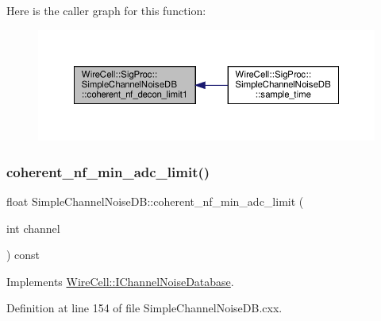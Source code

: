 Here is the caller graph for this function\+:
\nopagebreak
\begin{figure}[H]
\begin{center}
\leavevmode
\includegraphics[width=350pt]{class_wire_cell_1_1_sig_proc_1_1_simple_channel_noise_d_b_a570a71f729172f7b19659f21d44b2e81_icgraph}
\end{center}
\end{figure}
\mbox{\label{class_wire_cell_1_1_sig_proc_1_1_simple_channel_noise_d_b_ab501b262245b5c052abd49fd0d67c803}} 
\subsubsection{\texorpdfstring{coherent\+\_\+nf\+\_\+min\+\_\+adc\+\_\+limit()}{coherent\_nf\_min\_adc\_limit()}}
{\footnotesize\ttfamily float Simple\+Channel\+Noise\+D\+B\+::coherent\+\_\+nf\+\_\+min\+\_\+adc\+\_\+limit (\begin{DoxyParamCaption}\item[{int}]{channel }\end{DoxyParamCaption}) const\hspace{0.3cm}{\ttfamily [virtual]}}



Implements \hyperlink{class_wire_cell_1_1_i_channel_noise_database_a1668979331fd999d36d5cb5bb1ed00d6}{Wire\+Cell\+::\+I\+Channel\+Noise\+Database}.



Definition at line 154 of file Simple\+Channel\+Noise\+D\+B.\+cxx.

